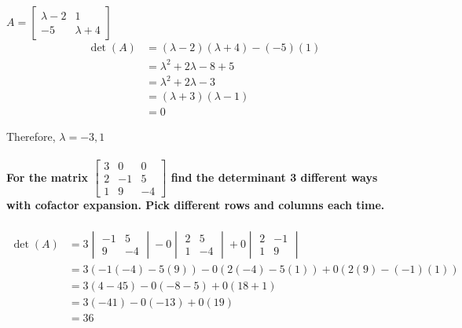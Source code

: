\documentclass[
  letterpaper,
  DIV=11,
  numbers=noendperiod]{scrartcl}
\let\oldparagraph\paragraph
\renewcommand{\paragraph}[1]{\oldparagraph{#1}\mbox{}}
\begin{document}
\(A = \begin{bmatrix}\lambda-2 & 1 \\ -5 & \lambda+4\end{bmatrix}\)
\begin{align*}
\det(A) &= (\lambda-2)(\lambda+4)-(-5)(1) \\
&= \lambda^2+2\lambda-8+5 \\
&= \lambda^2+2\lambda-3 \\
&= (\lambda+3)(\lambda-1) \\
&= 0
\end{align*}

Therefore, \(\lambda = -3, 1\)

\newpage{}

\paragraph{\texorpdfstring{For the matrix
\(\begin{bmatrix}3 & 0 & 0 \\2 & -1 & 5 \\ 1 & 9 & -4\end{bmatrix}\)
find the determinant 3 different ways with cofactor expansion. Pick
different rows and columns each
time.}{For the matrix \textbackslash begin\{bmatrix\}3 \& 0 \& 0 \textbackslash\textbackslash2 \& -1 \& 5 \textbackslash\textbackslash{} 1 \& 9 \& -4\textbackslash end\{bmatrix\} find the determinant 3 different ways with cofactor expansion. Pick different rows and columns each time.}}\label{for-the-matrix-beginbmatrix3-0-0-2--1-5-1-9--4endbmatrix-find-the-determinant-3-different-ways-with-cofactor-expansion.-pick-different-rows-and-columns-each-time.}

\begin{align*}
\det(A) &= 3\begin{vmatrix}-1 & 5 \\ 9 & -4\end{vmatrix}-0\begin{vmatrix}2 & 5 \\ 1 & -4\end{vmatrix}+0\begin{vmatrix}2 & -1 \\ 1 & 9\end{vmatrix} \\
&= 3(-1(-4)-5(9))-0(2(-4)-5(1))+0(2(9)-(-1)(1)) \\
&= 3(4-45)-0(-8-5)+0(18+1) \\
&= 3(-41)-0(-13)+0(19) \\
&= 36
\end{align*}
\end{document}
